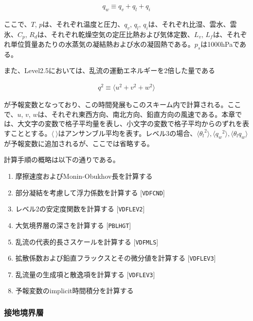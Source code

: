 \begin{eqnarray} q_w \equiv q_v+q_l+q_i \end{eqnarray}

ここで、\(T\), \(p\)は、それぞれ温度と圧力、\(q_v\), \(q_l\), \(q_i\)は、それぞれ比湿、雲水、雲氷、\(C_p\), \(R_d\)は、それぞれ乾燥空気の定圧比熱および気体定数、\(L_v\),
\(L_f\)は、それぞれ単位質量あたりの水蒸気の凝結熱および水の凝固熱である。\(p_s\)は1000hPaである。

また、Level2.5においては、乱流の運動エネルギーを2倍した量である

\begin{eqnarray}q^2 \equiv \langle u^2 + v^2 + w^2 \rangle\end{eqnarray}

が予報変数となっており、この時間発展もこのスキーム内で計算される。ここで、\(u\), \(v\),
\(w\)は、それぞれ東西方向、南北方向、鉛直方向の風速である。本章では、大文字の変数で格子平均量を表し、小文字の変数で格子平均からのずれを表すこととする。\(\langle \ \rangle\)はアンサンブル平均を表す。レベル3の場合、\(\langle {\theta_l}^2 \rangle,\langle {q_w}^2 \rangle,\langle \theta_l q_w \rangle\)
が予報変数に追加されるが、ここでは省略する。

計算手順の概略は以下の通りである。

\begin{enumerate}
\def\labelenumi{\arabic{enumi}.}
\tightlist
\item
  摩擦速度およびMonin-Obukhov長を計算する
\item
  部分凝結を考慮して浮力係数を計算する {[}\texttt{VDFCND}{]}
\item
  レベル2の安定度関数を計算する {[}\texttt{VDFLEV2}{]}
\item
  大気境界層の深さを計算する {[}\texttt{PBLHGT}{]}
\item
  乱流の代表的長さスケールを計算する {[}\texttt{VDFMLS}{]}
\item
  拡散係数および鉛直フラックスとその微分値を計算する {[}\texttt{VDFLEV3}{]}
\item
  乱流量の生成項と散逸項を計算する {[}\texttt{VDFLEV3}{]}
\item
  予報変数のimplicit時間積分を計算する
\end{enumerate}

\hypertarget{ux63a5ux5730ux5883ux754cux5c64}{%
\subsubsection{接地境界層}\label{ux63a5ux5730ux5883ux754cux5c64}}

